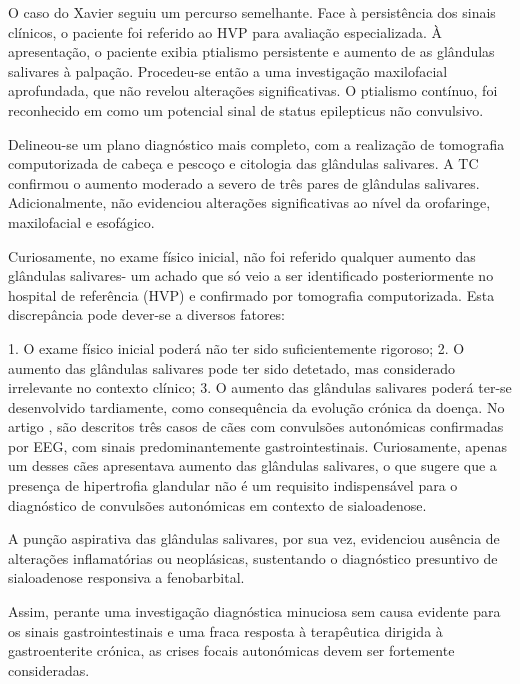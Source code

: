 O caso do Xavier seguiu um percurso semelhante. Face à persistência dos sinais clínicos, o paciente foi referido ao HVP para avaliação especializada. À apresentação, o paciente exibia ptialismo persistente e aumento de as glândulas salivares à palpação. Procedeu-se então a uma investigação maxilofacial aprofundada, que não revelou alterações significativas.  O ptialismo contínuo, foi reconhecido em \cite{Diop2025} como um potencial sinal de status epilepticus não convulsivo.


 Delineou-se um plano diagnóstico mais completo, com a realização de tomografia computorizada de cabeça e pescoço e citologia das glândulas salivares. A TC confirmou o aumento moderado a severo de três pares de glândulas salivares.  Adicionalmente, não evidenciou alterações significativas ao nível da orofaringe, maxilofacial e esofágico.


Curiosamente, no exame físico inicial, não foi referido qualquer aumento das glândulas salivares- um achado que só veio a ser identificado posteriormente no hospital de referência (HVP) e confirmado por tomografia computorizada. Esta discrepância pode dever-se a diversos fatores: 


1.	O exame físico inicial poderá não ter sido suficientemente rigoroso; 
2.	O aumento das glândulas salivares pode ter sido detetado, mas considerado irrelevante no contexto clínico;
3.	O aumento das glândulas salivares poderá ter-se desenvolvido tardiamente, como consequência da evolução crónica da doença. No artigo \cite{Diop2025}, são descritos três casos de cães com convulsões autonómicas confirmadas por EEG, com sinais predominantemente gastrointestinais. Curiosamente, apenas um desses cães apresentava aumento das glândulas salivares, o que sugere que a presença de hipertrofia glandular não é um requisito indispensável para o diagnóstico de convulsões autonómicas em contexto de sialoadenose.


A punção aspirativa das glândulas salivares, por sua vez, evidenciou ausência de alterações inflamatórias ou neoplásicas, sustentando o diagnóstico presuntivo de sialoadenose responsiva a fenobarbital. 


Assim, perante uma investigação diagnóstica minuciosa sem causa evidente para os sinais gastrointestinais e uma fraca resposta à terapêutica dirigida à gastroenterite crónica, as crises focais autonómicas devem ser fortemente consideradas. \cite{Diop2025}


